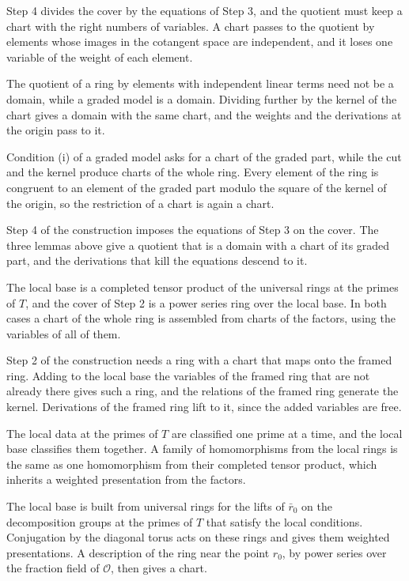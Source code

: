 Step 4 divides the cover by the equations of Step 3, and the quotient must keep a chart with the right numbers of variables. A chart passes to the quotient by elements whose images in the cotangent space are independent, and it loses one variable of the weight of each element.

The quotient of a ring by elements with independent linear terms need not be a domain, while a graded model is a domain. Dividing further by the kernel of the chart gives a domain with the same chart, and the weights and the derivations at the origin pass to it.

Condition (i) of a graded model asks for a chart of the graded part, while the cut and the kernel produce charts of the whole ring. Every element of the ring is congruent to an element of the graded part modulo the square of the kernel of the origin, so the restriction of a chart is again a chart.

Step 4 of the construction imposes the equations of Step 3 on the cover. The three lemmas above give a quotient that is a domain with a chart of its graded part, and the derivations that kill the equations descend to it.

The local base is a completed tensor product of the universal rings at the primes of $T$, and the cover of Step 2 is a power series ring over the local base. In both cases a chart of the whole ring is assembled from charts of the factors, using the variables of all of them.

Step 2 of the construction needs a ring with a chart that maps onto the framed ring. Adding to the local base the variables of the framed ring that are not already there gives such a ring, and the relations of the framed ring generate the kernel. Derivations of the framed ring lift to it, since the added variables are free.

The local data at the primes of $T$ are classified one prime at a time, and the local base classifies them together. A family of homomorphisms from the local rings is the same as one homomorphism from their completed tensor product, which inherits a weighted presentation from the factors.

The local base is built from universal rings for the lifts of $\bar r_0$ on the decomposition groups at the primes of $T$ that satisfy the local conditions. Conjugation by the diagonal torus acts on these rings and gives them weighted presentations. A description of the ring near the point $r_0$, by power series over the fraction field of $\mathcal O$, then gives a chart.

